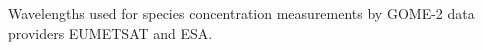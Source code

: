 \label{fig:gomeproducts}

Wavelengths used for species concentration measurements by GOME-2 data providers EUMETSAT and ESA.

